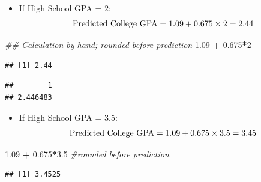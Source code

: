 \documentclass[
]{book}
\newenvironment{Shaded}{\begin{snugshade}}{\end{snugshade}}
\newcommand{\CommentTok}[1]{\textcolor[rgb]{0.56,0.35,0.01}{\textit{#1}}}
\newcommand{\DataTypeTok}[1]{\textcolor[rgb]{0.13,0.29,0.53}{#1}}
\newcommand{\DecValTok}[1]{\textcolor[rgb]{0.00,0.00,0.81}{#1}}
\newcommand{\FloatTok}[1]{\textcolor[rgb]{0.00,0.00,0.81}{#1}}
\newcommand{\KeywordTok}[1]{\textcolor[rgb]{0.13,0.29,0.53}{\textbf{#1}}}
\newcommand{\NormalTok}[1]{#1}
\newcommand{\OperatorTok}[1]{\textcolor[rgb]{0.81,0.36,0.00}{\textbf{#1}}}
\newcommand{\StringTok}[1]{\textcolor[rgb]{0.31,0.60,0.02}{#1}}
\providecommand{\tightlist}{%
  \setlength{\itemsep}{0pt}\setlength{\parskip}{0pt}}
\begin{document}
\begin{itemize}
\tightlist
\item
  If High School GPA = 2:\\
  \[ \hbox{Predicted College GPA} = 1.09 + 0.675 \times 2 = 2.44 \]
\end{itemize}

\begin{Shaded}
\begin{Highlighting}[]
\CommentTok{## Calculation by hand; rounded before prediction}
\FloatTok{1.09} \OperatorTok{+}\StringTok{ }\FloatTok{0.675}\OperatorTok{*}\DecValTok{2}
\end{Highlighting}
\end{Shaded}

\begin{verbatim}
## [1] 2.44
\end{verbatim}

\begin{Shaded}
\end{Shaded}

\begin{verbatim}
##        1 
## 2.446483
\end{verbatim}

\begin{itemize}
\tightlist
\item
  If High School GPA = 3.5:\\
  \[ \hbox{Predicted College GPA} = 1.09 + 0.675 \times 3.5 = 3.45 \]
\end{itemize}

\begin{Shaded}
\begin{Highlighting}[]
\FloatTok{1.09} \OperatorTok{+}\StringTok{ }\FloatTok{0.675}\OperatorTok{*}\FloatTok{3.5} \CommentTok{#rounded before prediction}
\end{Highlighting}
\end{Shaded}

\begin{verbatim}
## [1] 3.4525
\end{verbatim}
\end{document}
